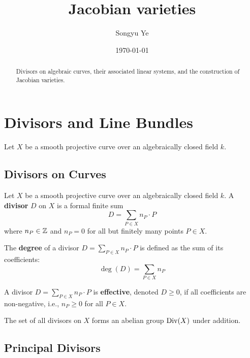 \documentclass[12pt]{article}
\begin{document}
\rhead{\today}
\cfoot{\thepage}

\title{Jacobian varieties}

\author{Songyu Ye}
\date{\today}
\maketitle


\begin{abstract}
    Divisors on algebraic curves, their associated linear systems, and the construction of Jacobian varieties.
\end{abstract}

\tableofcontents
\section{Divisors and Line Bundles}
Let $X$ be a smooth projective curve over an algebraically closed field $k$.
\subsection{Divisors on Curves}

\begin{definition}[Divisor]
    Let $X$ be a smooth projective curve over an algebraically closed field $k$. A \textbf{divisor} $D$ on $X$ is a formal finite sum
    \[D = \sum_{P \in X} n_P \cdot P\]
    where $n_P \in \mathbb{Z}$ and $n_P = 0$ for all but finitely many points $P \in X$.
\end{definition}

\begin{definition}
    The \textbf{degree} of a divisor $D = \sum_{P \in X} n_P \cdot P$ is defined as the sum of its coefficients:
    \[\deg(D) = \sum_{P \in X} n_P\]
\end{definition}

\begin{definition}
    A divisor $D = \sum_{P \in X} n_P \cdot P$ is \textbf{effective}, denoted $D \geq 0$, if all coefficients are non-negative, i.e., $n_P \geq 0$ for all $P \in X$.
\end{definition}

The set of all divisors on $X$ forms an abelian group $\operatorname{Div}(X)$ under addition.

\subsection{Principal Divisors}
\end{document}
